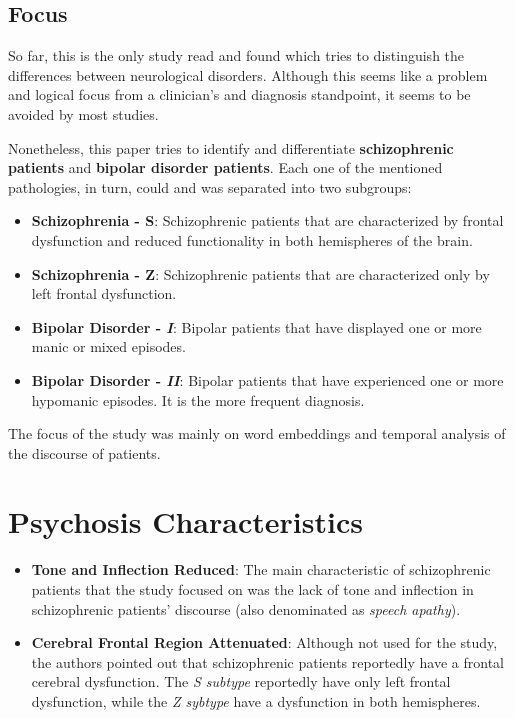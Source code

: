 \documentclass{Paper_Summary}
\begin{document}
\makepapertitle

\breakline

\begin{center}
    \section*{Focus}
\end{center}
    
    So far, this is the only study read and found which tries to distinguish the differences between neurological disorders. Although this seems like a problem and logical focus from a clinician's and diagnosis standpoint, it seems to be avoided by most studies.

    Nonetheless, this paper tries to identify and differentiate \textbf{schizophrenic patients} and \textbf{bipolar disorder patients}. Each one of the mentioned pathologies, in turn, could and was separated into two subgroups:
    \begin{itemize}
        \item \textbf{Schizophrenia - S}: Schizophrenic patients that are characterized by frontal dysfunction and reduced functionality in both hemispheres of the brain.
        \item \textbf{Schizophrenia - Z}: Schizophrenic patients that are characterized only by left frontal dysfunction.
        \item \textbf{Bipolar Disorder - \emph{I}}: Bipolar patients that have displayed one or more manic or mixed episodes.
        \item \textbf{Bipolar Disorder - \emph{II}}: Bipolar patients that have experienced one or more hypomanic episodes. It is the more frequent diagnosis.
    \end{itemize}

    The focus of the study was mainly on word embeddings and temporal analysis of the discourse of patients.

\breakline

\newpage

\section{Psychosis Characteristics}
    \begin{itemize}
        \item \textbf{Tone and Inflection Reduced}: The main characteristic of schizophrenic patients that the study focused on was the lack of tone and inflection in schizophrenic patients' discourse (also denominated as \emph{speech apathy}).
        \item \textbf{Cerebral Frontal Region Attenuated}: Although not used for the study, the authors pointed out that schizophrenic patients reportedly have a frontal cerebral dysfunction. The \emph{S subtype} reportedly have only left frontal dysfunction, while the \emph{Z sybtype} have a dysfunction in both hemispheres.
    \end{itemize}
\end{document}
